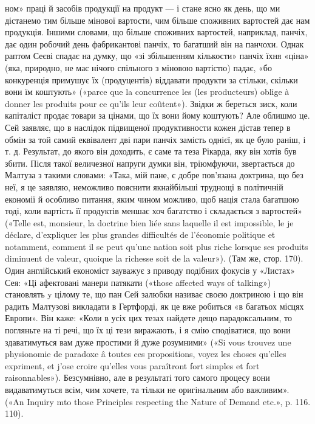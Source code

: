 ном» праці й засобів продукції на продукт — і стане ясно як день, що
ми дістанемо тим більше мінової вартости, чим більше споживних вартостей
дає нам продукція. Іншими словами, що більше споживних вартостей,
наприклад, панчіх, дає один робочий день фабрикантові панчіх,
то багатший він на панчохи. Однак раптом Сеєві спадає на думку, що «зі
збільшенням кількости» панчіх їхня «ціна» (яка, природно, не має нічого
спільного з міновою вартістю) падає, «бо конкуренція примушує їх (продуцентів)
віддавати продукти за стільки, скільки вони їм коштують»
(«parce que la concurrence les (les producteurs) oblige à donner les produits
pour ce qu’ils leur coûtent»). Звідки ж береться зиск, коли капіталіст
продає товари за цінами, що їх вони йому коштують? Але облишмо
це. Сей заявляє, що в наслідок підвищеної продуктивности кожен дістав
тепер в обмін за той самий еквівалент дві пари панчіх замість однієї, як
це було раніш, і т. д. Результат, до якого він доходить, є саме та теза
Рікарда, яку він хотів був збити. Після такої величезної напруги думки
він, тріюмфуючи, звертається до Малтуза з такими словами: «Така, мій
пане, є добре пов’язана доктрина, що без неї, я це заявляю, неможливо
пояснити якнайбільші труднощі в політичній економії й особливо питання,
яким чином можливо, щоб нація стала багатшою тоді, коли вартість її
продуктів меншає хоч багатство і складається з вартостей» («Telle est,
monsieur, la doctrine bien liée sans laquelle il est impossible, le je déclare,
d’expliquer les plus grandes difficultés de l’économie politique et notamment,
comment il se peut qu’une nation soit plus riche lorsque ses produits
diminuent de valeur, quoique la richesse soit de la valeur»). (Там же, стор.
170). Один англійський економіст зауважує з приводу подібних фокусів
у «Листах» Сея: «Ці афектовані манери патякати («those affected ways
of talking») становлять y цілому те, що пан Сей залюбки називає своєю
доктриною і що він радить Малтузові викладати в Гертфорді, як це вже
робиться «в багатьох місцях Европи». Він каже: «Коли в усіх цих тезах
найдете дещо парадоксальним, то погляньте на ті речі, що їх ці тези виражають,
і я смію сподіватися, що вони здаватимуться вам дуже простими
й дуже розумними» («Si vous trouvez une physionomie de paradoxe â
toutes ces propositions, voyez les choses qu’elles expriment, et j’ose croire
qu’elles vous paraîtront fort simples et fort raisonnables»). Безсумнівно,
але в результаті того самого процесу вони видаватимуться всім, чим хочете,
та тільки не оригінальним або важливим». («An Inquiry mto those
Principles respecting the Nature of Demand etc.», p. 116. 110).
